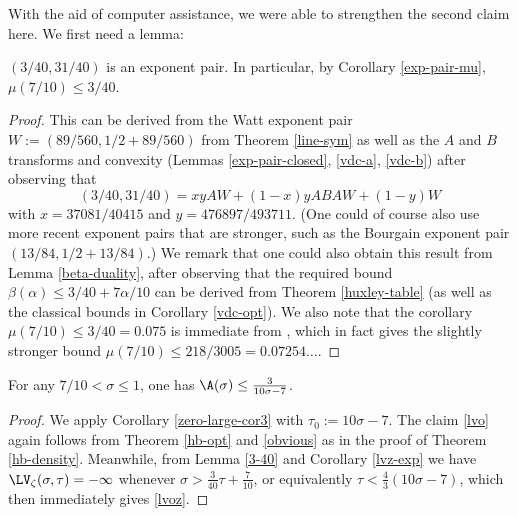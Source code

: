 With the aid of computer assistance, we were able to strengthen the second claim here.  We first need a lemma:

\begin{lemma}\label{3-40} $(3/40, 31/40)$ is an exponent pair.  In particular, by Corollary \ref{exp-pair-mu}, $\mu(7/10) \leq 3/40$.
\end{lemma}

\derived
{}

\begin{proof}  This can be derived from the Watt exponent pair $W := (89/560, 1/2 + 89/560)$ from Theorem \ref{line-sym} as well as the $A$ and $B$ transforms and convexity (Lemmas \ref{exp-pair-closed}, \ref{vdc-a}, \ref{vdc-b}) after observing that
$$(3/40,31/40) = xy AW + (1-x)y ABA W + (1-y) W$$
with $x=37081/40415$ and $y=476897/493711$.  (One could of course also use more recent exponent pairs that are stronger, such as the Bourgain exponent pair $(13/84, 1/2+13/84)$.)  We remark that one could also obtain this result from Lemma \ref{beta-duality}, after observing that the required bound $\beta(\alpha) \leq 3/40 + 7\alpha/10$ can be derived from Theorem \ref{huxley-table} (as well as the classical bounds in Corollary \ref{vdc-opt}).  We also note that the corollary $\mu(7/10) \leq 3/40 = 0.075$ is immediate from \cite[Theorem 2.4]{trudgian-yang}, which in fact gives the slightly stronger bound $\mu(7/10) \leq 218/3005 = 0.07254\dots$.
\end{proof}

\begin{theorem}\label{hb-density2} For any $7/10 < \sigma \leq 1$, one has $\A(\sigma) \leq \frac{3}{10\sigma-7}$.
\end{theorem}
\derived
{}

\begin{proof}  We apply Corollary \ref{zero-large-cor3} with $\tau_0 := 10\sigma-7$.  The claim \eqref{lvo} again follows from
    Theorem \ref{hb-opt} and \eqref{obvious} as in the proof of Theorem \ref{hb-density}.  Meanwhile, from Lemma \ref{3-40} and Corollary \ref{lvz-exp} we have $\LV_\zeta(\sigma,\tau) = -\infty$ whenever $\sigma > \frac{3}{40} \tau + \frac{7}{10}$, or equivalently $\tau < \frac{4}{3} (10\sigma-7)$, which then immediately gives \eqref{lvoz}.
\end{proof}

